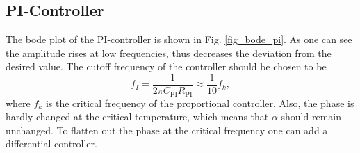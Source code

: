 \documentclass[a4paper,10pt]{article}
\begin{document}
\subsection{PI-Controller}
The bode plot of the PI-controller is shown in Fig. \ref{fig_bode_pi}. As one can see the amplitude rises at low frequencies, thus decreases the deviation from the desired value. The cutoff frequency of the controller should be chosen to be
\begin{equation}
  f_I = \frac{1}{2 \pi C_{\mathrm{PI}} R_{\mathrm{PI}}}\approx \frac{1}{10} f_k,
\end{equation}
where $f_k$ is the critical frequency of the proportional controller.\cite{halbleiter} Also, the phase is hardly changed at the critical temperature, which means that $\alpha$ should remain unchanged. To flatten out the phase at the critical frequency one can add a differential controller.
\end{document}
